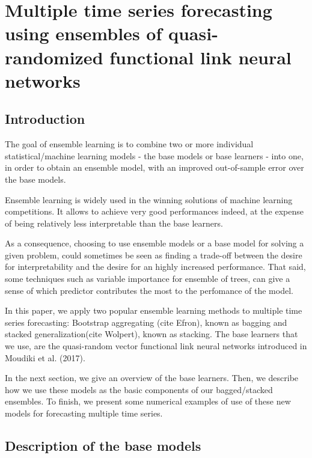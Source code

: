 %
\chapter{Multiple time series forecasting using ensembles of quasi-randomized functional link neural networks}
\label{sec:rvfl_ensembles}

\section{Introduction}

The goal of ensemble learning is to combine two or more individual statistical/machine learning models - the base models or base learners - into one, in order to obtain an ensemble model, with an improved out-of-sample error over the base models.

\medskip

Ensemble learning is widely used in the winning solutions of machine learning competitions. It allows to achieve very good performances indeed, at the expense of being relatively less interpretable than the base learners.

\medskip

As a consequence, choosing to use ensemble models or a base model for solving a given problem, could sometimes be seen as finding a trade-off between the desire for interpretability and the desire for an highly increased performance. That said, some techniques such as variable importance for ensemble of trees, can give a sense of which predictor contributes the most to the perfomance of the model.

\medskip

In this paper, we apply two popular ensemble learning methods to multiple time series forecasting: Bootstrap aggregating (cite Efron), known as bagging and stacked generalization(cite Wolpert), known as stacking. The base learners that we use, are the quasi-random vector functional link neural networks introduced in Moudiki et al. (2017).

\medskip

In the next section, we give an overview of the base learners. Then, we describe how we use these models as the basic components of our bagged/stacked ensembles. To finish, we present some numerical examples of use of these new models for forecasting multiple time series.

\section{Description of the base models}
\label{sec:basemodeldesc}

